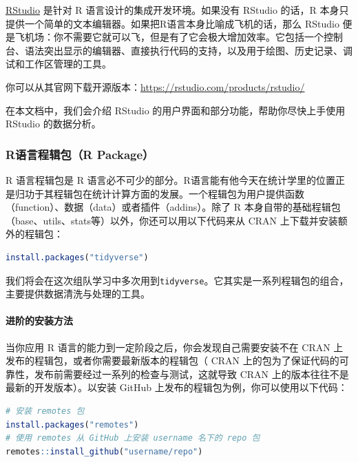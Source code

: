 \documentclass[]{ctexbook}
\let\oldparagraph\paragraph
\renewcommand{\paragraph}[1]{\oldparagraph{#1}\mbox{}}
\newcommand{\passthrough}[1]{#1}
\begin{document}
\href{https://rstudio.com/products/rstudio/}{RStudio} 是针对 R 语言设计的集成开发环境。如果没有 RStudio 的话，R 本身只提供一个简单的文本编辑器。如果把R语言本身比喻成飞机的话，那么 RStudio 便是飞机场：你不需要它就可以飞，但是有了它会极大增加效率。它包括一个控制台、语法突出显示的编辑器、直接执行代码的支持，以及用于绘图、历史记录、调试和工作区管理的工具。

你可以从其官网下载开源版本：\url{https://rstudio.com/products/rstudio/}

在本文档中，我们会介绍 RStudio 的用户界面和部分功能，帮助你尽快上手使用 RStudio 的数据分析。

\hypertarget{rux8bedux8a00ux7a0bux8f91ux5305r-package}{%
\subsubsection{R语言程辑包（R Package）}\label{rux8bedux8a00ux7a0bux8f91ux5305r-package}}

R 语言程辑包是 R 语言必不可少的部分。R语言能有他今天在统计学里的位置正是归功于其程辑包在统计计算方面的发展。一个程辑包为用户提供函数（function）、数据（data）或者插件（addins）。除了 R 本身自带的基础程辑包（base、utils、stats等）以外，你还可以用以下代码来从 CRAN 上下载并安装额外的程辑包：

\begin{lstlisting}[language=R]
install.packages("tidyverse")
\end{lstlisting}

我们将会在这次组队学习中多次用到\passthrough{\lstinline!tidyverse!}。它其实是一系列程辑包的组合，主要提供数据清洗与处理的工具。

\hypertarget{ux8fdbux9636ux7684ux5b89ux88c5ux65b9ux6cd5}{%
\paragraph{进阶的安装方法}\label{ux8fdbux9636ux7684ux5b89ux88c5ux65b9ux6cd5}}

当你应用 R 语言的能力到一定阶段之后，你会发现自己需要安装不在 CRAN 上发布的程辑包，或者你需要最新版本的程辑包（ CRAN 上的包为了保证代码的可靠性，发布前需要经过一系列的检查与测试，这就导致 CRAN 上的版本往往不是最新的开发版本）。以安装 GitHub 上发布的程辑包为例，你可以使用以下代码：

\begin{lstlisting}[language=R]
# 安装 remotes 包
install.packages("remotes")
# 使用 remotes 从 GitHub 上安装 username 名下的 repo 包
remotes::install_github("username/repo")
\end{lstlisting}
\end{document}

